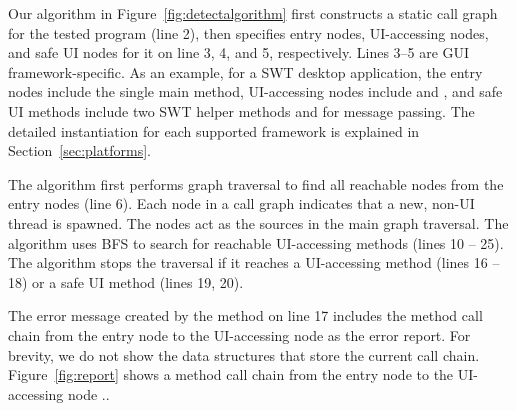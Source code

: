 Our algorithm in Figure~\ref{fig:detectalgorithm} %
first constructs a static call graph for the tested program (line 2),
then specifies entry nodes, UI-accessing nodes, and safe UI nodes
for it on line 3, 4, and 5, respectively. Lines 3--5 are GUI framework-specific.
As an example, for a SWT desktop application, the entry nodes include
the single main method, UI-accessing nodes include 
 and ,
and safe UI methods include two SWT helper methods   and
 for message passing. The detailed instantiation
for each supported framework is explained in Section~\ref{sec:platforms}.

The algorithm first performs graph traversal to find all reachable 
nodes from the entry nodes (line 6).
Each  node in a call graph indicates that a new,
non-UI thread is spawned.  The 
nodes act as the sources in the main graph traversal.
The algorithm uses BFS to search for reachable UI-accessing
methods (lines 10 -- 25).
The algorithm stops the traversal if it reaches a UI-accessing
method (lines 16 -- 18) or a safe UI method (lines 19, 20).

The error message created by the method  on line 17
includes the method call chain from the entry node to the UI-accessing node
as the error report. For brevity, we do not show the data structures that store
the current call chain.
Figure~\ref{fig:report} shows a method call chain from the entry
node  to the UI-accessing node ..




